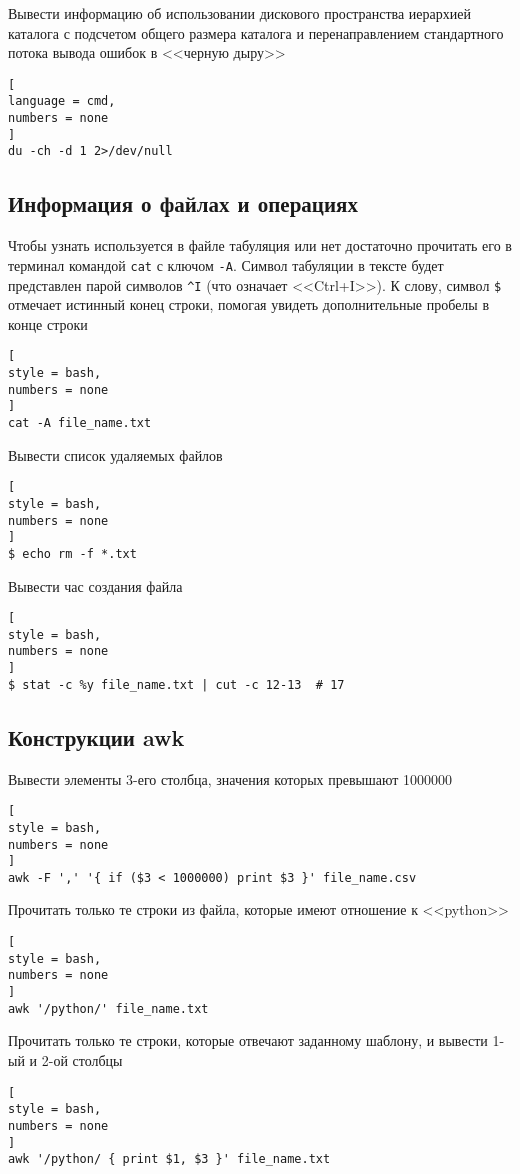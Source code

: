 \documentclass[%
	11pt,
	a4paper,
	utf8,
		]{article}
\begin{document}
Вывести информацию об использовании дискового пространства иерархией каталога с подсчетом общего размера каталога и перенаправлением стандартного потока вывода ошибок в <<черную дыру>>
\begin{lstlisting}[
language = cmd,
numbers = none
]
du -ch -d 1 2>/dev/null
\end{lstlisting}

\subsection{Информация о файлах и операциях}

Чтобы узнать используется в файле табуляция или нет достаточно прочитать его в терминал командой \texttt{cat} с ключом \verb|-A|. Символ табуляции в тексте будет представлен парой символов \verb|^I| (что означает <<Ctrl+I>>). К слову, символ \verb|$| отмечает истинный конец строки, помогая увидеть дополнительные пробелы в конце строки
\begin{lstlisting}[
style = bash,
numbers = none
]
cat -A file_name.txt
\end{lstlisting}

Вывести список удаляемых файлов
\begin{lstlisting}[
style = bash,
numbers = none
]
$ echo rm -f *.txt
\end{lstlisting}

Вывести час создания файла
\begin{lstlisting}[
style = bash,
numbers = none
]
$ stat -c %y file_name.txt | cut -c 12-13  # 17
\end{lstlisting}

\subsection{Конструкции awk}

Вывести элементы 3-его столбца, значения которых превышают 1000000
\begin{lstlisting}[
style = bash,
numbers = none
]
awk -F ',' '{ if ($3 < 1000000) print $3 }' file_name.csv
\end{lstlisting}

Прочитать только те строки из файла, которые имеют отношение к <<python>>
\begin{lstlisting}[
style = bash,
numbers = none
]
awk '/python/' file_name.txt
\end{lstlisting}

Прочитать только те строки, которые отвечают заданному шаблону, и вывести 1-ый и 2-ой столбцы
\begin{lstlisting}[
style = bash,
numbers = none
]
awk '/python/ { print $1, $3 }' file_name.txt
\end{lstlisting}
\end{document}
